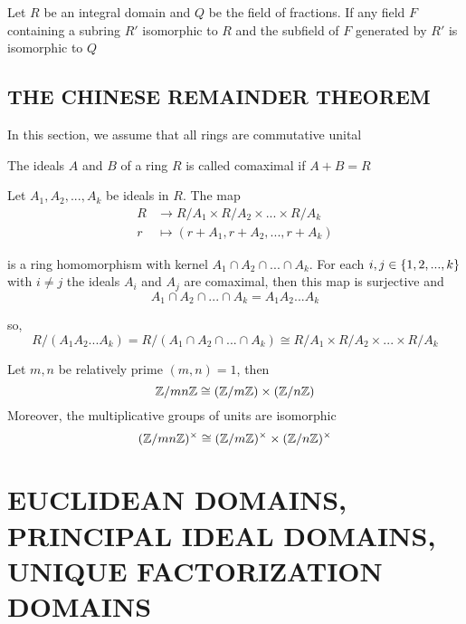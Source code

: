 \begin{corollary}
	Let $R$ be an integral domain and $Q$ be the field of fractions. If any field $F$ containing a subring $R'$ isomorphic to $R$ and the subfield of $F$ generated by $R'$ is isomorphic to $Q$
\end{corollary}

\subsection{THE CHINESE REMAINDER THEOREM}

\begin{remark}
	In this section, we assume that all rings are commutative unital
\end{remark}

\begin{definition}[comaximal]
	The ideals $A$ and $B$ of a ring $R$ is called comaximal if $A + B = R$
\end{definition}

\begin{theorem}
	Let $A_1, A_2, ..., A_k$ be ideals in $R$. The map
	\begin{align*}
		R &\to R / A_1 \times R / A_2 \times ... \times R / A_k \\
		r &\mapsto (r + A_1, r + A_2, ..., r + A_k)
	\end{align*}
	
	is a ring homomorphism with kernel $A_1 \cap A_2 \cap ... \cap A_k$. For each $i, j \in \{1, 2, ..., k\}$ with $i \neq j$ the ideals $A_i$ and $A_j$ are comaximal, then this map is surjective and
	$$
		A_1 \cap A_2 \cap ... \cap A_k = A_1 A_2 ... A_k
	$$
	
	so,
	$$
		R / (A_1 A_2 ... A_k) = R / (A_1 \cap A_2 \cap ... \cap A_k) \cong R / A_1 \times R / A_2 \times ... \times R / A_k
	$$
\end{theorem}

\begin{corollary}
	Let  $m, n$ be relatively prime $(m ,n) = 1$, then
	$$
		\mathbb{Z} / mn\mathbb{Z} \cong (\mathbb{Z} / m\mathbb{Z}) \times (\mathbb{Z} / n\mathbb{Z})
	$$
	Moreover, the multiplicative groups of units are isomorphic
	$$
		(\mathbb{Z} / mn\mathbb{Z})^\times \cong (\mathbb{Z} / m\mathbb{Z})^\times \times (\mathbb{Z} / n\mathbb{Z})^\times
	$$
\end{corollary}

\section{EUCLIDEAN DOMAINS, PRINCIPAL IDEAL DOMAINS, \\ UNIQUE FACTORIZATION DOMAINS}

